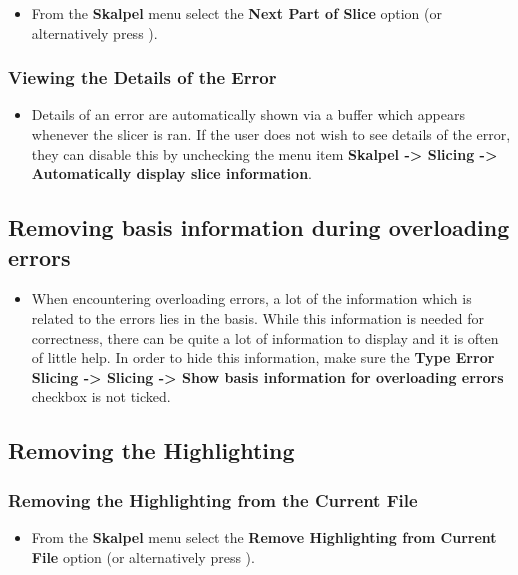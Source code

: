 \documentclass{article}
\begin{document}
\begin{itemize}
\item From the \textbf{Skalpel} menu select the \textbf{Next Part of
  Slice} option (or alternatively press ).
\end{itemize}

\subsubsection{Viewing the Details of the Error}

\begin{itemize}
\item Details of an error are automatically shown via a buffer which
  appears whenever the slicer is ran. If the user does not wish to see
  details of the error, they can disable this by unchecking the menu
  item \textbf{Skalpel -> Slicing -> Automatically display
    slice information}.
\end{itemize}

\subsection{Removing basis information during overloading errors}
\begin{itemize}
\item When encountering overloading errors, a lot of the information
  which is related to the errors lies in the basis. While this
  information is needed for correctness, there can be quite a lot of
  information to display and it is often of little help. In order to
  hide this information, make sure the \textbf{Type Error Slicing ->
    Slicing -> Show basis information for overloading errors} checkbox
  is not ticked.
\end{itemize}


\subsection{Removing the Highlighting}

\subsubsection{Removing the Highlighting from the Current File}

\begin{itemize}
\item From the \textbf{Skalpel} menu select the \textbf{Remove
  Highlighting from Current File} option (or alternatively press
  ).
\end{itemize}
\end{document}
